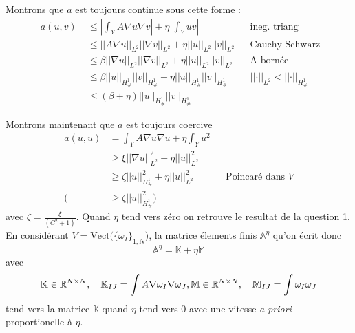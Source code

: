 \documentclass[11pt]{article}
\newcommand{\Am}{\mathbb{A}}
\newcommand{\R}{\mathbb{R}}
\newcommand{\K}{\mathbb{K}}
\newcommand{\M}{\mathbb{M}}
\newcommand{\norm}[1]{\left|\left|#1\right|\right|}
\newcommand{\Hd}{H^1_{\#}}
\begin{document}
Montrons que $a$ est toujours continue sous cette forme :
\begin{align*}
  \big|a(u,v)\big| &\leq \left| \int_Y A \nabla u \nabla v \right| + \eta \left| \int_Y  u v \right| && \mbox{ineg. triang} \\
                   &\leq \norm{A\nabla u}_{L^2} \norm{\nabla v}_{L^2} + \eta \norm{u}_{L^2} \norm{v}_{L^2} && \mbox{Cauchy Schwarz} \\
                   &\leq \beta \norm{\nabla u}_{L^2} \norm{\nabla v}_{L^2} + \eta \norm{u}_{L^2} \norm{v}_{L^2} && \mbox{A bornée} \\
                   &\leq \beta \norm{u}_{\Hd} \norm{v}_{\Hd} + \eta \norm{u}_{\Hd} \norm{v}_{\Hd} && \norm{\cdot}_{L^2}<\norm{\cdot}_{\Hd} \\
                   &\leq (\beta + \eta) \norm{u}_{\Hd} \norm{v}_{\Hd}
\end{align*}

Montrons maintenant que $a$ est toujours coercive
\begin{align*}
  a(u,u) &= \int_Y A \nabla u  \nabla u + \eta \int_Y u^2 \\
         &\geq \xi \norm{\nabla u}^2_{L^2} + \eta \norm{u}^2_{L^2} \\
         &\geq \zeta \norm{u}^2_{\Hd} + \eta \norm{ u}^2_{L^2} && \text{Poincaré dans }V\\
    \big(&\geq \zeta  \norm{u}^2_{\Hd}\big)
\end{align*} 
avec $\zeta = \frac{\xi}{(C^2+1)}$. Quand $\eta$ tend vers zéro on retrouve le resultat de la question 1. En considérant $V = \text{Vect}\big(\{\omega_I\}_{1,N})$, la matrice élements finis $\Am^{\eta}$ qu'on écrit donc
\[
  \Am^{\eta} = \K + \eta \M 
\]
avec
\[
  \K \in \R^{N\times N},\quad \K_{IJ} = \int A \nabla \omega_I \nabla \omega_J,  \\
  \M \in \R^{N\times N},\quad \M_{IJ} = \int \omega_I \omega_J
\]
tend vers la matrice $\K$ quand $\eta$ tend vers $0$ avec une vitesse \emph{a priori} proportionelle à $\eta$.
\end{document}

